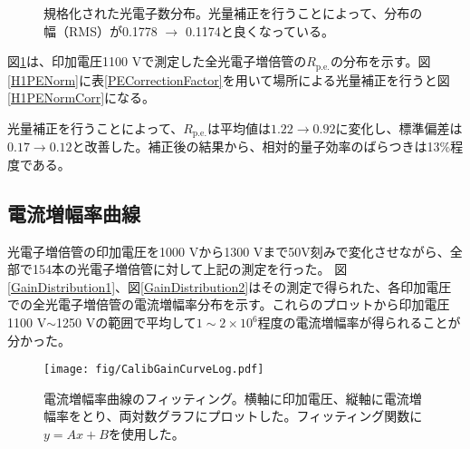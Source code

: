 \documentclass[11pt]{jreport}
\newcommand{\figref}[1]{図\ref{#1}}
\newcommand{\tabref}[1]{表\ref{#1}}
\newcommand{\pe}{\mathrm{p.e.}}
\begin{document}
\begin{figure}[!h]
\centering
  \begin{minipage}{0.8\textwidth}
  \end{minipage}
  \begin{minipage}{0.8\textwidth}
  \end{minipage}
    \caption[規格化された光電子数分布]{規格化された光電子数分布。光量補正を行うことによって、分布の幅（RMS）が0.1778 $\rightarrow$ 0.1174と良くなっている。}
  \label{H1PECorr}
\end{figure}

\figref{H1PECorr}は、印加電圧1100 Vで測定した全光電子増倍管の$R_{\pe}$の分布を示す。\figref{H1PENorm}に\tabref{PECorrectionFactor}を用いて場所による光量補正を行うと\figref{H1PENormCorr}になる。

光量補正を行うことによって、$R_{\pe}$は平均値は$1.22 \rightarrow 0.92$に変化し、標準偏差は$0.17 \rightarrow 0.12$と改善した。補正後の結果から、相対的量子効率のばらつきは13\%程度である。




\subsection{電流増幅率曲線}
光電子増倍管の印加電圧を1000 Vから1300 Vまで50V刻みで変化させながら、全部で154本の光電子増倍管に対して上記の測定を行った。
\figref{GainDistribution1}、\figref{GainDistribution2}はその測定で得られた、各印加電圧での全光電子増倍管の電流増幅率分布を示す。これらのプロットから印加電圧1100 V$\sim$1250 Vの範囲で平均して$1\sim2\times 10^{6}$程度の電流増幅率が得られることが分かった。



\begin{figure}[htbp]
\centering
\texttt{[image: fig/CalibGainCurveLog.pdf]}
\caption[電流増幅率曲線のフィッティング]{電流増幅率曲線のフィッティング。横軸に印加電圧、縦軸に電流増幅率をとり、両対数グラフにプロットした。フィッティング関数に$y=Ax+B$を使用した。}
\label{GainCurve}
\end{figure}
\end{document}
